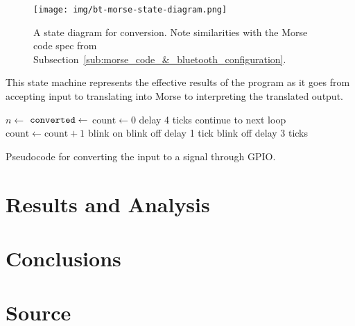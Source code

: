 \documentclass[11pt]{article}
\begin{document}
\begin{figure}[ht]
    \centering
    \texttt{[image: img/bt-morse-state-diagram.png]}
    \caption{A state diagram for conversion. Note similarities with the Morse code spec from Subsection~\ref{sub:morse_code_&_bluetooth_configuration}.}
    \label{fig:bt-morse-state-diagram}
\end{figure}


This state machine represents the effective results of the program as it goes from accepting input to translating into Morse to interpreting the translated output.


\begin{algorithm}[ht]
    \begin{algorithmic}[l]
        \State $n \gets$ 
        \State $\texttt{converted} \gets$ 
            \State $\text{count} \gets 0$
                \State delay 4 ticks
                \State continue to next loop
            \EndIf
                \State $\text{count} \gets \text{count} + 1$
            \EndWhile
                    \State blink on
                \Else
                    \State blink off
                \EndIf
                \State delay 1 tick
            \EndFor
            \State blink off
            \State delay 3 ticks
        \EndFor
        \EndProcedure
    \end{algorithmic}
    \caption{Pseudocode for converting the input to a signal through GPIO.}
    \label{alg:blink_signal_from_input}
\end{algorithm}


\section{Results and Analysis}
\label{sec:results_and_analysis}




\section{Conclusions}
\label{sec:conclusions}




\section{Source}
\label{sec:source}



\end{document}
